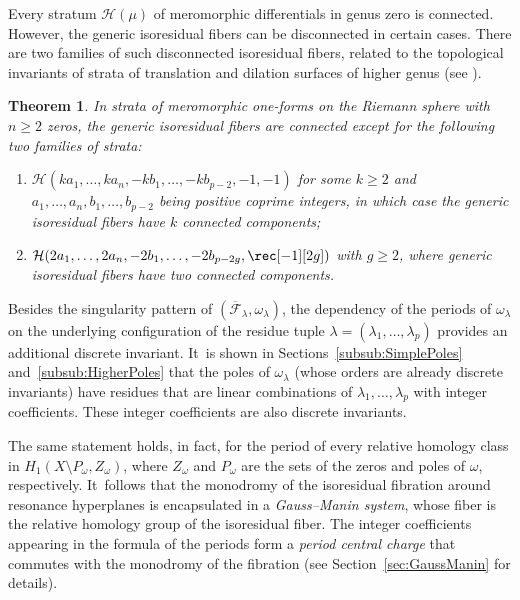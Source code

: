 \documentclass[JEP,XML,SOM,Unicode,NoFloatCountersInSection,published]{cedram}
\newtheorem{thm}{Theorem}[section]
\theoremstyle{definition}
\begin{document}
Every stratum $\mathcal{H}(\mu)$ of meromorphic differentials in genus zero is connected. However, the generic isoresidual fibers can be disconnected in certain cases. There are two families of such disconnected isoresidual fibers, related to the topological invariants of strata of translation and dilation surfaces of higher genus (see \cite{Bo,ABW}).
\begin{thm}\label{thm:MAIN5}
In strata of meromorphic one-forms on the Riemann sphere with $n \geq 2$ zeros, the generic isoresidual fibers are connected except for the following two families of strata:
\begin{enumerate}
\item\label{thm:MAIN51}
$\mathcal{H}(ka_{1},\dots,ka_{n},-kb_{1},\dots,-kb_{p-2},-1,-1)$ for some $k \geq 2$ and $a_{1},\dots,a_{n},\allowbreak b_{1},\dots,b_{p-2}$ being positive coprime integers, in which case the generic isoresidual fibers have $k$ connected components;

\item\label{thm:MAIN52}
$\mathcal{H}(2a_{1},\dots,2a_{n},-2b_{1},\dots,-2b_{p-2g},\rec[-1][2g])$ with $g \geq 2$, where generic isoresidual fibers have two connected components.
\end{enumerate}
\end{thm}

Besides the singularity pattern of $(\overline{\mathcal{F}}_{\lambda},\omega_{\lambda})$, the dependency of the periods of $\omega_{\lambda}$ on the underlying configuration of the residue tuple $\lambda = (\lambda_{1},\ldots,\lambda_{p})$ provides an additional discrete invariant. It~is shown in Sections~\ref{subsub:SimplePoles} and~\ref{subsub:HigherPoles} that the poles of $\omega_{\lambda}$ (whose orders are already discrete invariants) have residues that are linear combinations of $\lambda_{1},\dots,\lambda_{p}$ with integer coefficients. These integer coefficients are also discrete invariants.

The same statement holds, in fact, for the period of every relative homology class in $H_{1}(X \setminus P_{\omega},Z_{\omega})$, where $Z_{\omega}$ and $P_{\omega}$ are the sets of the zeros and poles of $\omega$, respectively. It~follows that the monodromy of the isoresidual fibration around resonance hyperplanes is encapsulated in a \textit{Gauss--Manin system}, whose fiber is the relative homology group of the isoresidual fiber. The integer coefficients appearing in the \hbox{formula} of the periods form a \textit{period central charge} that commutes with the monodromy of the fibration (see Section~\ref{sec:GaussManin} for details).
\end{document}

